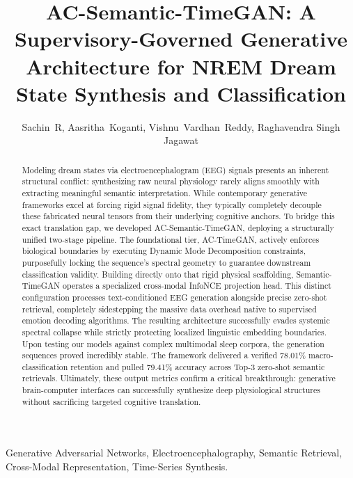 \documentclass[journal]{IEEEtran}
\begin{document}
\title{AC-Semantic-TimeGAN: A Supervisory-Governed Generative Architecture for NREM Dream State Synthesis and Classification}

\author{
Sachin~R,
Aasritha~Koganti,
Vishnu~Vardhan~Reddy,
Raghavendra Singh Jagawat
}

\maketitle

\begin{abstract}
Modeling dream states via electroencephalogram (EEG) signals presents an inherent structural conflict: synthesizing raw neural physiology rarely aligns smoothly with extracting meaningful semantic interpretation. While contemporary generative frameworks excel at forcing rigid signal fidelity, they typically completely decouple these fabricated neural tensors from their underlying cognitive anchors. To bridge this exact translation gap, we developed AC-Semantic-TimeGAN, deploying a structurally unified two-stage pipeline. The foundational tier, AC-TimeGAN, actively enforces biological boundaries by executing Dynamic Mode Decomposition constraints, purposefully locking the sequence's spectral geometry to guarantee downstream classification validity. Building directly onto that rigid physical scaffolding, Semantic-TimeGAN operates a specialized cross-modal InfoNCE projection head. This distinct configuration processes text-conditioned EEG generation alongside precise zero-shot retrieval, completely sidestepping the massive data overhead native to supervised emotion decoding algorithms. The resulting architecture successfully evades systemic spectral collapse while strictly protecting localized linguistic embedding boundaries. Upon testing our models against complex multimodal sleep corpora, the generation sequences proved incredibly stable. The framework delivered a verified 78.01\% macro-classification retention and pulled 79.41\% accuracy across Top-3 zero-shot semantic retrievals. Ultimately, these output metrics confirm a critical breakthrough: generative brain-computer interfaces can successfully synthesize deep physiological structures without sacrificing targeted cognitive translation.
\end{abstract}

\begin{IEEEkeywords}
Generative Adversarial Networks, Electroencephalography, Semantic Retrieval, Cross-Modal Representation, Time-Series Synthesis.
\end{IEEEkeywords}
\end{document}
